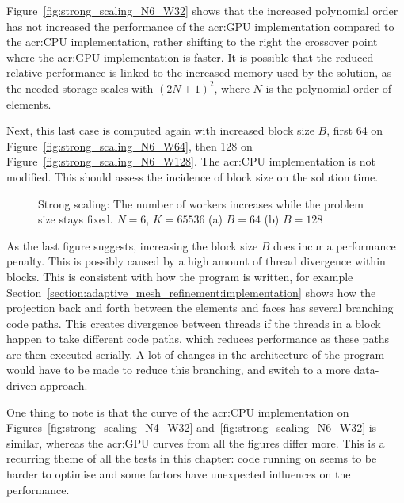 Figure~\ref{fig:strong_scaling_N6_W32} shows that the increased polynomial order has not increased
the performance of the \acrshort{acr:GPU} implementation compared to the \acrshort{acr:CPU}
implementation, rather shifting to the right the crossover point where the \acrshort{acr:GPU}
implementation is faster. It is possible that the reduced relative performance is linked to the
increased memory used by the solution, as the needed storage scales with \({\left( 2 N + 1
        \right)}^2\), where \(N\) is the polynomial order of elements.

Next, this last case is computed again with increased block size \(B\), first 64 on
Figure~\ref{fig:strong_scaling_N6_W64}, then 128 on Figure~\ref{fig:strong_scaling_N6_W128}. The
\acrshort{acr:CPU} implementation is not modified. This should assess the incidence of block size on
the solution time.

\begin{figure}[H]
    \centering
    \subfloat[\(B = 64\)]
    {\label{fig:strong_scaling_N6_W64}}
    \hfill
    \subfloat[\(B = 128\)]
    {\label{fig:strong_scaling_N6_W128}}
    \caption{Strong scaling: The number of workers increases while the problem size stays fixed. \(N
        = 6\), \(K = 65536\) (a) \(B = 64\) (b) \(B = 128\)}\label{fig:strong_scaling_N6_W64-128}
\end{figure}

As the last figure suggests, increasing the block size \(B\) does incur a performance penalty. This
is possibly caused by a high amount of thread divergence within blocks. This is consistent with how
the program is written, for example Section~\ref{section:adaptive_mesh_refinement:implementation}
shows how the projection back and forth between the elements and faces has several branching code
paths. This creates divergence between threads if the threads in a block happen to take different
code paths, which reduces performance as these paths are then executed serially. A lot of changes in
the architecture of the program would have to be made to reduce this branching, and switch to a more
data-driven approach.

One thing to note is that the curve of the \acrshort{acr:CPU} implementation on
Figures~\ref{fig:strong_scaling_N4_W32} and~\ref{fig:strong_scaling_N6_W32} is similar, whereas the
\acrshort{acr:GPU} curves from all the figures differ more. This is a recurring theme of all the
tests in this chapter: code running on  seems to be harder to optimise and some
factors have unexpected influences on the performance.

